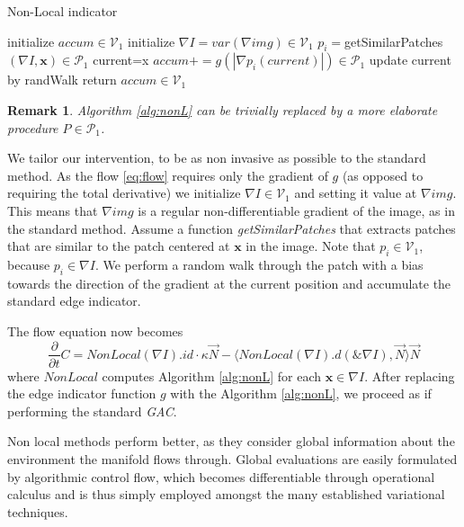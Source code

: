 \documentclass{article}
\newcommand{\VV}{\mathcal{V}}
\newcommand{\dP}{\mathcal{P}}
\newtheorem{opomba}{Remark}[section]
\begin{document}
   \begin{algorithm}[H]
     \caption{Non-Local indicator}
     \label{alg:nonL}
     \begin{algorithmic}[1]
     \Procedure{NonLocalIndicator}{$\mathbf{x}, \nabla img\in\VV_0$}
     \State initialize $accum\in\VV_1$
     \State initialize $\nabla I=var(\nabla img)\in\VV_1$
     \State $p_i=$getSimilarPatches$(\nabla I,\mathbf{x})\in\dP_1$
     \State current=x
     \State $accum+=g(|\nabla p_i(current)|)\in\dP_1$
     \State update current by randWalk
     \EndFor
     \EndFor
     \State return $accum\in\VV_1$
     \EndProcedure
     \end{algorithmic}
     \end{algorithm}
     
     \begin{opomba}
          Algorithm \ref{alg:nonL} can be trivially replaced by a more elaborate procedure $P\in\dP_1$.
          \end{opomba}
   
   We tailor  our intervention, to be as non invasive as possible to the standard method. As the flow \eqref{eq:flow} requires only the gradient of $g$ (as opposed to requiring the total derivative) we initialize $\nabla I\in\VV_1$ and setting it value at $\nabla img$. This means that $\nabla img$ is a regular non-differentiable gradient of the image, as in the standard method. Assume a function \emph{getSimilarPatches} that extracts patches that are similar to the patch centered at $\mathbf{x}$ in the image. Note that $p_i\in\VV_1$, because $p_i\in\nabla I$. We perform a random walk through the patch with a bias towards the direction of the gradient at the current position  and accumulate the standard edge indicator.
   
   The flow equation now becomes
   \begin{equation}\label{eq:flow2}
     \frac{\partial}{\partial t}C=NonLocal(\nabla I).id\cdot\kappa \vec{N}-\langle NonLocal(\nabla I).d(\&\nabla I),\vec{N}\rangle\vec{N}
     \end{equation}
     where $NonLocal$ computes Algorithm \ref{alg:nonL} for each $\mathbf{x}\in\nabla I$. After replacing the edge indicator function $g$ with the Algorithm \ref{alg:nonL}, we proceed as if performing the standard \emph{GAC}.
     
     Non local methods perform better, as they consider global information about the environment the manifold flows through. Global evaluations are easily formulated by algorithmic control flow, which becomes differentiable through operational calculus and is thus simply employed amongst the many established variational techniques.
         
\end{document}
